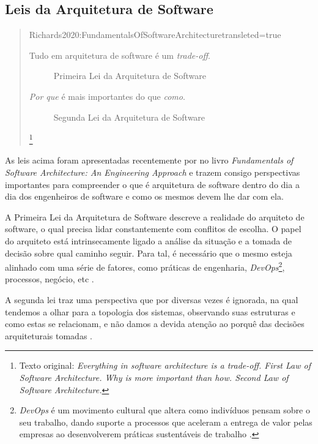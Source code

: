 \subsection{Leis da Arquitetura de Software}

\begin{quotation}{Richards2020:FundamentalsOfSoftwareArchitecture}{transleted=true}
  \begin{description}
    \item [Tudo em arquitetura de software é um \textit{trade-off}.] Primeira Lei da Arquitetura de
        Software
    \item [\textit{Por que} é mais importantes do que \textit{como}.] Segunda Lei da Arquitetura de Software
  \end{description}\footnote{Texto original: \textit{Everything in software architecture is a trade-off. First Law
    of Software Architecture. Why is more important than how. Second Law of Software Architecture.}}
\end{quotation}

As leis acima foram apresentadas recentemente por 
no livro \textit{Fundamentals of Software Architecture: An Engineering Approach} e trazem consigo
perspectivas importantes para compreender o que é arquitetura de software dentro do dia a dia dos
engenheiros de software e como os mesmos devem lhe dar com ela.

A Primeira Lei da Arquitetura de Software descreve a realidade do arquiteto de
software, o qual precisa lidar constantemente com conflitos de escolha. O papel do arquiteto está
intrinsecamente ligado a análise da situação e a tomada de decisão sobre qual caminho seguir. Para
tal, é necessário que o mesmo esteja alinhado com uma série de fatores, como práticas de engenharia,
\textit{DevOps}\footnote{\textit{DevOps} é um movimento cultural que altera como indivíduos pensam
sobre o seu trabalho, dando suporte a processos que aceleram a entrega de valor pelas empresas ao
desenvolverem práticas sustentáveis de trabalho \cite{davis2016effective}.}, processos, negócio, etc
\cite{Richards2020:FundamentalsOfSoftwareArchitecture}.

A segunda lei traz uma perspectiva que por diversas vezes é ignorada, na qual tendemos a olhar para
a topologia dos sistemas, observando suas estruturas e como estas se relacionam, e não damos a devida
atenção ao porquê das decisões arquiteturais tomadas \cite{Richards2020:FundamentalsOfSoftwareArchitecture}.

